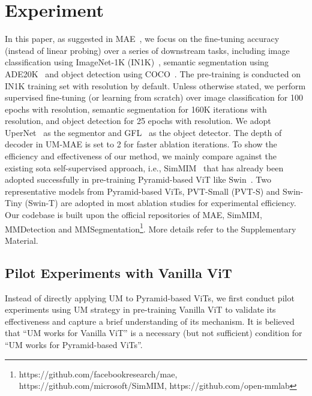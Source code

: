 \documentclass{article}
\begin{document}
\section{Experiment}
In this paper, as suggested in MAE~\cite{he2021masked}, we focus on the fine-tuning accuracy (instead of linear probing) over a series of downstream tasks, including image classification using ImageNet-1K (IN1K)~\cite{deng2009imagenet}, semantic segmentation using ADE20K~\cite{zhou2017scene} and object detection using COCO~\cite{lin2014microsoft}. The pre-training is conducted on IN1K training set with  resolution by default. Unless otherwise stated, we perform supervised fine-tuning (or learning from scratch) over image classification for 100 epochs with  resolution, semantic segmentation for 160K iterations with  resolution, and object detection for 25 epochs with  resolution. We adopt UperNet~\cite{xiao2018unified} as the segmentor and GFL~\cite{li2020generalized} as the object detector. The depth of decoder in UM-MAE is set to 2 for faster ablation iterations. 
To show the efficiency and effectiveness of our method, we mainly compare against the existing sota self-supervised approach, i.e., SimMIM~\cite{xie2021simmim} that has already been adopted successfully in pre-training Pyramid-based ViT like Swin~\cite{liu2021swin,liu2021swinv2}. Two representative models from Pyramid-based ViTs, PVT-Small (PVT-S) and Swin-Tiny (Swin-T) are adopted in most ablation studies for experimental efficiency. Our 
codebase is built upon the official repositories of MAE, SimMIM, MMDetection and MMSegmentation\footnote{\scriptsize https://github.com/facebookresearch/mae, https://github.com/microsoft/SimMIM, https://github.com/open-mmlab}. More details refer to the Supplementary Material.



\subsection{Pilot Experiments with Vanilla ViT}
Instead of directly applying UM to Pyramid-based ViTs, we first conduct pilot experiments using UM strategy in pre-training Vanilla ViT to validate its effectiveness and capture a brief understanding of its mechanism. It is believed that ``UM works for Vanilla ViT'' is a necessary (but not sufficient) condition for ``UM works for Pyramid-based ViTs''. 
\end{document}

